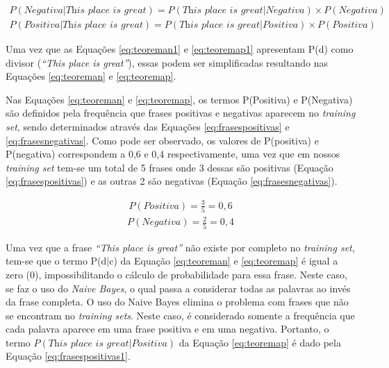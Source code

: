 \begin{equation}
\begin{gathered}
P(Negativa|\textit{This place is great})
=
P(\textit{This place is great}|Negativa) \times
P(Negativa)
\label{eq:teoreman}
\end{gathered}
\end{equation}
\begin{equation}
\begin{gathered}
P(Positiva|\textit{This place is great})
=
P(\textit{This place is great}|Positiva) \times
P(Positiva)
\label{eq:teoremap}
\end{gathered}
\end{equation}

Uma vez que as Equações \ref{eq:teoreman1} e \ref{eq:teoremap1}
apresentam P(d) como divisor (\textit{``This place is great''}), essas podem ser
simplificadas resultando nas Equações \ref{eq:teoreman} e \ref{eq:teoremap}.

Nas Equações \ref{eq:teoreman} e \ref{eq:teoremap}, os termos P(Positiva) e
P(Negativa) são definidos pela frequência que frases positivas e negativas aparecem no \textit{training set}, sendo determinados
através das Equações \ref{eq:frasespositivas} e \ref{eq:frasesnegativas}. Como
pode ser observado, os valores de P(positiva) e P(negativa) correspondem a 0,6
e 0,4 respectivamente, uma vez que em nossos \textit{training set} tem-se um
total de 5 frases onde 3 dessas são positivas (Equação \ref{eq:frasespositivas})
e as outras 2 são negativas (Equação \ref{eq:frasesnegativas}).

\begin{equation}
\begin{gathered}
P(Positiva)
=
\frac{3}{5} = 0,6
\label{eq:frasespositivas}
\end{gathered}
\end{equation}
\begin{equation}
\begin{gathered}
P(Negativa)
=
\frac{2}{5} = 0,4
\label{eq:frasesnegativas}
\end{gathered}
\end{equation}

Uma vez que a frase \textit{``This place is great''} não existe por completo no
\textit{training set}, tem-se que o termo P(d$\vert$c) da Equação
\ref{eq:teoreman} e \ref{eq:teoremap} é igual a zero (0), impossibilitando o
cálculo de probabilidade para essa frase. Neste caso, se faz o uso do
\textit{Naive Bayes}, o qual passa a considerar todas as palavras ao invés da
frase completa. O uso do Naive Bayes elimina o problema com frases que não se
encontram no \textit{training sets}. Neste caso, é considerado somente a
frequência que cada palavra aparece em uma frase positiva e em uma negativa.
Portanto, o termo $P(\textit{This place is
great}|Positiva)$ da Equação \ref{eq:teoremap} é dado pela Equação
\ref{eq:frasespositivas1}.

